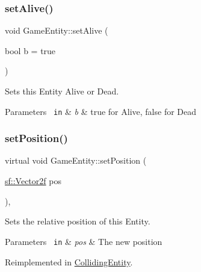 \subsubsection{\texorpdfstring{setAlive()}{setAlive()}}
{\footnotesize\ttfamily void Game\+Entity\+::set\+Alive (\begin{DoxyParamCaption}\item[{bool}]{b = {\ttfamily true} }\end{DoxyParamCaption})\hspace{0.3cm}{\ttfamily [inline]}}



Sets this Entity Alive or Dead. 


\begin{DoxyParams}[1]{Parameters}
\mbox{\texttt{ in}}  & {\em b} & true for Alive, false for Dead \\
\hline
\end{DoxyParams}
\mbox{\label{class_game_entity_ac3187e535e46571a54e1256958ee4a80}} 
\subsubsection{\texorpdfstring{setPosition()}{setPosition()}\hspace{0.1cm}{\footnotesize\ttfamily [1/2]}}
{\footnotesize\ttfamily virtual void Game\+Entity\+::set\+Position (\begin{DoxyParamCaption}\item[{\mbox{\hyperlink{classsf_1_1_vector2}{sf\+::\+Vector2f}}}]{pos }\end{DoxyParamCaption})\hspace{0.3cm}{\ttfamily [inline]}, {\ttfamily [virtual]}}



Sets the relative position of this Entity. 


\begin{DoxyParams}[1]{Parameters}
\mbox{\texttt{ in}}  & {\em pos} & The new position \\
\hline
\end{DoxyParams}


Reimplemented in \mbox{\hyperlink{class_colliding_entity_a9fe117b77d6df746538d25ca501ea47a}{Colliding\+Entity}}.

\mbox{\label{class_game_entity_a8b4178da06ec2792acfe4480e3e2c8e2}} 
